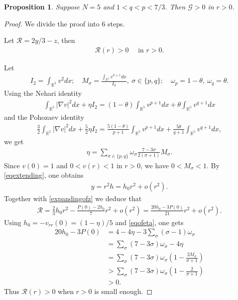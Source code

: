 \documentclass{article}
\newtheorem{proposition}[theorem]{Proposition}
\theoremstyle{definition} \theoremstyle{remark}
\numberwithin{equation}{section}
\newcommand{\R}{\mathbb{R}}
\newcommand{\G}{\mathcal{G}}
\newcommand{\cR}{\mathcal{R}}
\begin{document}
	\begin{proposition} \label{propG>03}
		Suppose $N = 5$ and $1 < q < p < 7/3$. Then $\G > 0$ in $r > 0$.
	\end{proposition}

	\begin{proof} We divide the proof into 6 steps.

\vskip0.12in

 Let $\cR = 2y/3 - z$, then
		\begin{align} \label{eqcR}
			\cR(r) > 0 \quad \text{ in } r > 0.
		\end{align}

		Let
		\begin{align}
			I_2 = \int_{\R^5}v^2dx; \quad M_{\sigma} = \frac{\int_{\R^5}v^{\sigma+1}dx}{I_2}, ~ \sigma \in \{p,q\}; \quad \omega_{p} = 1-\theta, ~ \omega_{q} = \theta.
		\end{align}
		Using the Nehari identity
		\begin{align*}
			\int_{\R^5}|\nabla v|^2dx + \eta I_2 = (1-\theta)\int_{\R^5}v^{p+1}dx + \theta \int_{\R^5}v^{q+1}dx
		\end{align*}
		and the Pohozaev identity
		\begin{align*}
			\frac{3}{2}\int_{\R^5}|\nabla v|^2dx + \frac{5}{2}\eta I_2 = \frac{5(1-\theta)}{p+1}\int_{\R^5}v^{p+1}dx + \frac{5\theta}{q+1}\int_{\R^5}v^{q+1}dx,
		\end{align*}
		we get
		\begin{align} \label{eqofeta}
			\eta = \sum_{\sigma \in \{p,q\}} \omega_\sigma \frac{7 - 3\sigma}{2(\sigma+1)}M_\sigma.
		\end{align}
		Since $v(0) = 1$ and $0 < v(r) < 1$ in $r > 0$, we have $0 < M_\sigma < 1$. By \eqref{eqextending}, one obtains
		\begin{align*}
			y = r^2h = h_0r^2 + o(r^2).
		\end{align*}
		Together with \eqref{expandingofz} we deduce that
		\begin{align*}
			\cR = \frac23 h_0r^2 - \frac{P(0) - 2h_0}{7} r^2 + o(r^2) = \frac{20h_0 - 3P(0)}{21}r^2 + o(r^2).
		\end{align*}
		Using $h_0 = -v_{rr}(0) = (1-\eta)/5$ and \eqref{eqofeta}, one gets
		\begin{align*}
			20h_0 - 3P(0) & = 4 - 4\eta - 3\sum_{\sigma}(\sigma - 1)\omega_\sigma \\
			& = \sum_\sigma (7 - 3\sigma)\omega_\sigma - 4\eta \\
			& = \sum_\sigma (7-3\sigma)\omega_\sigma \left(1 - \frac{2M_\sigma}{\sigma + 1}\right) \\
			& > \sum_\sigma (7-3\sigma)\omega_\sigma \left(1 - \frac{2}{\sigma + 1}\right) \\
			& > 0.
		\end{align*}
		Thus $\cR(r) > 0$ when $r > 0$ is small enough.


\end{proof}
\end{document}
